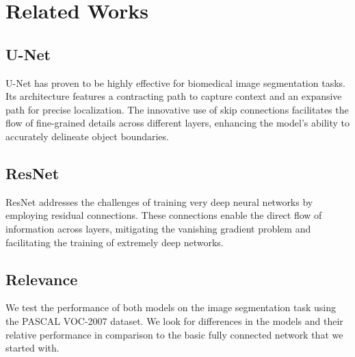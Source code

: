 \section*{Related Works}

\subsection*{U-Net} 
U-Net \cite{ronneberger2015unet} has proven to be highly effective for biomedical image segmentation tasks. Its architecture features a contracting path to capture context and an expansive path for precise localization. The innovative use of skip connections facilitates the flow of fine-grained details across different layers, enhancing the model's ability to accurately delineate object boundaries.

\subsection*{ResNet} 
ResNet \cite{he2015deep} addresses the challenges of training very deep neural networks by employing residual connections. These connections enable the direct flow of information across layers, mitigating the vanishing gradient problem and facilitating the training of extremely deep networks.

\subsection*{Relevance} 
We test the performance of both models on the image segmentation task using the PASCAL VOC-2007 dataset. We look for differences in the models and their relative performance in comparison to the basic fully connected network that we started with.


